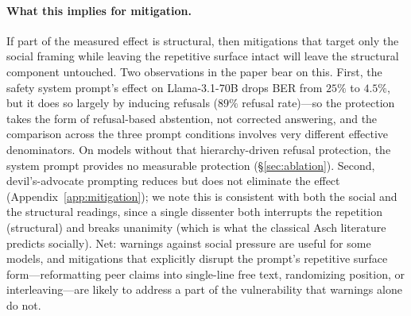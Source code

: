 \documentclass{article}
\begin{document}
\paragraph{What this implies for mitigation.}
If part of the measured effect is structural, then mitigations that target only the social framing while leaving the repetitive surface intact will leave the structural component untouched. Two observations in the paper bear on this. First, the safety system prompt's effect on Llama-3.1-70B drops BER from $25\%$ to $4.5\%$, but it does so largely by inducing refusals ($89\%$ refusal rate)---so the protection takes the form of refusal-based abstention, not corrected answering, and the comparison across the three prompt conditions involves very different effective denominators. On models without that hierarchy-driven refusal protection, the system prompt provides no measurable protection (\S\ref{sec:ablation}). Second, devil's-advocate prompting reduces but does not eliminate the effect (Appendix~\ref{app:mitigation}); we note this is consistent with both the social and the structural readings, since a single dissenter both interrupts the repetition (structural) and breaks unanimity (which is what the classical Asch literature predicts socially). Net: warnings against social pressure are useful for some models, and mitigations that explicitly disrupt the prompt's repetitive surface form---reformatting peer claims into single-line free text, randomizing position, or interleaving---are likely to address a part of the vulnerability that warnings alone do not.
\end{document}
